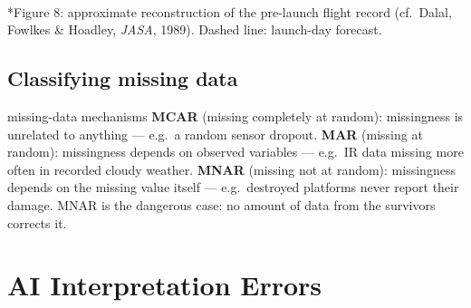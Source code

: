 \documentclass[11pt]{article}
\begin{document}
\begin{center}\\*{\small\color{GreyN}Figure 8: approximate reconstruction of the pre-launch flight record (cf.\ Dalal, Fowlkes \& Hoadley, \textit{JASA}, 1989). Dashed line: launch-day forecast.}\end{center}

\subsection{Classifying missing data}
\begin{definition}{missing-data mechanisms}
\textbf{MCAR} (missing completely at random): missingness is unrelated to anything --- e.g.\ a random sensor dropout. \textbf{MAR} (missing at random): missingness depends on observed variables --- e.g.\ IR data missing more often in recorded cloudy weather. \textbf{MNAR} (missing not at random): missingness depends on the missing value itself --- e.g.\ destroyed platforms never report their damage. MNAR is the dangerous case: no amount of data from the survivors corrects it.
\end{definition}

\section{AI Interpretation Errors}
\end{document}
